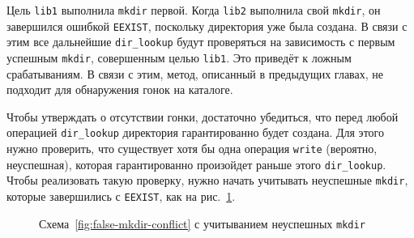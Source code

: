 Цель \texttt{lib1} выполнила \texttt{mkdir} первой. Когда \texttt{lib2} выполнила свой \texttt{mkdir}, он завершился ошибкой \texttt{EEXIST}, поскольку директория уже была создана. В связи с этим все дальнейшие \texttt{dir\_lookup} будут проверяться на зависимость с первым успешным \texttt{mkdir}, совершенным целью \texttt{lib1}. Это приведёт к ложным срабатываниям. В связи с этим, метод, описанный в предыдущих главах, не подходит для обнаружения гонок на каталоге.

Чтобы утверждать о отсутствии гонки, достаточно убедиться, что перед любой операцией \texttt{dir\_lookup} директория гарантированно будет создана. Для этого нужно проверить, что существует хотя бы одна операция \texttt{write} (вероятно, неуспешная), которая гарантированно произойдет раньше этого \texttt{dir\_lookup}. Чтобы реализовать такую проверку, нужно начать учитывать неуспешные \texttt{mkdir}, которые завершились с \texttt{EEXIST}, как на рис.~\ref{fig:false-mkdir-conflict-fixed}.

\begin{figure}[H]
    \centering
    \caption{Схема~\ref{fig:false-mkdir-conflict} с учитыванием неуспешных \texttt{mkdir}}
    \label{fig:false-mkdir-conflict-fixed}
\end{figure}

